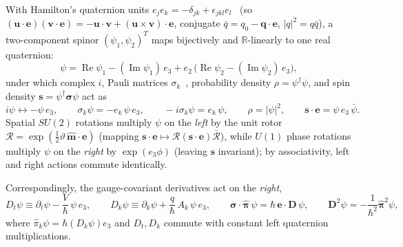 \documentclass[aps,prd,onecolumn,tightenlines,nofootinbib,notitlepage,10pt,floatfix]{revtex4-2}
\theoremstyle{indentedtheorem}
\begin{document}
With Hamilton's quaternion units $e_j e_k=-\delta_{jk}+\epsilon_{jkl}e_l$~\citep{Hamilton1844Quaternions} (so $(\mathbf{u}\cdot\mathbf{e})(\mathbf{v}\cdot\mathbf{e})=-\mathbf{u}\cdot\mathbf{v}+(\mathbf{u}\times\mathbf{v})\cdot\mathbf{e}$, conjugate $\bar{q}=q_0-\mathbf{q}\cdot\mathbf{e}$, $|q|^2=q\bar{q}$), a two-component spinor $(\psi_1,\psi_2)^T$ maps bijectively and $\mathbb{R}$-linearly to one real quaternion:
\begin{equation}
    \psi = \operatorname{Re}\psi_1 - (\operatorname{Im}\psi_1)\,e_3 + e_2\,\big(\operatorname{Re}\psi_2 - (\operatorname{Im}\psi_2)\,e_3\big) ,
    \label{eq:spinor_quaternion}
\end{equation}
under which complex $i$, Pauli matrices $\sigma_k$~\citep{Pauli1927Magnetischen}, probability density $\rho=\psi^\dagger\psi$, and spin density $\mathbf{s}=\psi^\dagger\boldsymbol{\sigma}\psi$ act as
\begin{equation}
    i\psi \longleftrightarrow -\psi\,e_3 , \qquad \sigma_k\psi = -e_k\,\psi\,e_3 , \qquad -i\sigma_k\psi = e_k\,\psi , \qquad \rho = |\psi|^2 , \qquad \mathbf{s}\cdot\mathbf{e} = \psi\,e_3\,\bar{\psi} .
    \label{eq:pauli_quaternion}
\end{equation}
Spatial $SU(2)$ rotations multiply $\psi$ on the \emph{left} by the unit rotor $\mathcal{R}=\exp(\tfrac{1}{2}\vartheta\,\hat{\mathbf{m}}\cdot\mathbf{e})$ (mapping $\mathbf{s}\cdot\mathbf{e}\mapsto\mathcal{R}(\mathbf{s}\cdot\mathbf{e})\bar{\mathcal{R}}$), while $U(1)$ phase rotations multiply $\psi$ on the \emph{right} by $\exp(e_3\phi)$ (leaving $\mathbf{s}$ invariant); by associativity, left and right actions commute identically.

Correspondingly, the gauge-covariant derivatives act on the \emph{right},
\begin{equation}
    D_t\psi \equiv \partial_t\psi - \frac{V}{\hbar}\,\psi\,e_3 , \qquad D_k\psi \equiv \partial_k\psi + \frac{q}{\hbar}\,A_k\,\psi\,e_3 , \qquad \boldsymbol{\sigma}\cdot\hat{\boldsymbol{\pi}}\,\psi = \hbar\,\mathbf{e}\cdot\mathbf{D}\,\psi , \qquad \mathbf{D}^2\psi = -\frac{1}{\hbar^2}\hat{\boldsymbol{\pi}}^2\psi ,
    \label{eq:right_connection}
\end{equation}
where $\hat{\pi}_k\psi=\hbar(D_k\psi)e_3$ and $D_t,D_k$ commute with constant left quaternion multiplications.
\end{document}
